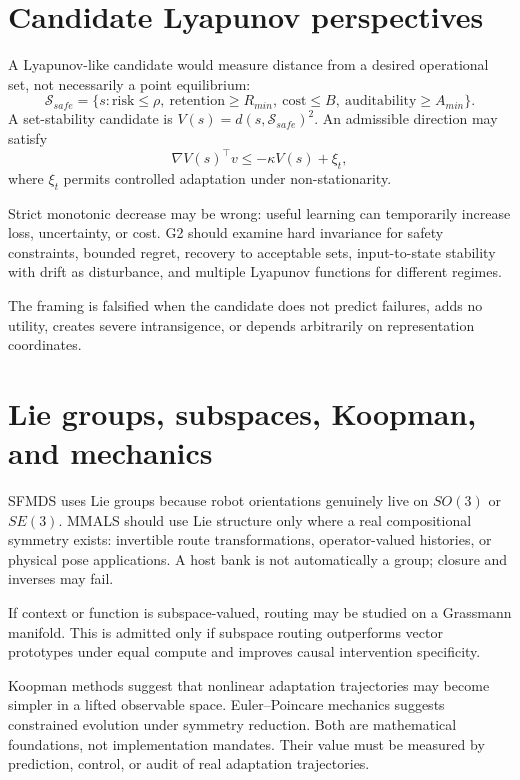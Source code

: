 \documentclass[11pt,a4paper]{article}
\begin{document}
\section{Candidate Lyapunov perspectives}
A Lyapunov-like candidate would measure distance from a desired operational set, not necessarily a point equilibrium:
\begin{equation}
\mathcal{S}_{safe}=\{s:\mathrm{risk}\le\rho,\ \mathrm{retention}\ge R_{min},\ \mathrm{cost}\le B,\ \mathrm{auditability}\ge A_{min}\}.
\end{equation}
A set-stability candidate is $V(s)=d(s,\mathcal{S}_{safe})^2$. An admissible direction may satisfy
\begin{equation}
\nabla V(s)^\top v\le-\kappa V(s)+\xi_t,
\end{equation}
where $\xi_t$ permits controlled adaptation under non-stationarity.

Strict monotonic decrease may be wrong: useful learning can temporarily increase loss, uncertainty, or cost. G2 should examine hard invariance for safety constraints, bounded regret, recovery to acceptable sets, input-to-state stability with drift as disturbance, and multiple Lyapunov functions for different regimes.

The framing is falsified when the candidate does not predict failures, adds no utility, creates severe intransigence, or depends arbitrarily on representation coordinates.

\section{Lie groups, subspaces, Koopman, and mechanics}
SFMDS uses Lie groups because robot orientations genuinely live on $SO(3)$ or $SE(3)$. MMALS should use Lie structure only where a real compositional symmetry exists: invertible route transformations, operator-valued histories, or physical pose applications. A host bank is not automatically a group; closure and inverses may fail.

If context or function is subspace-valued, routing may be studied on a Grassmann manifold. This is admitted only if subspace routing outperforms vector prototypes under equal compute and improves causal intervention specificity.

Koopman methods suggest that nonlinear adaptation trajectories may become simpler in a lifted observable space. Euler--Poincare mechanics suggests constrained evolution under symmetry reduction. Both are mathematical foundations, not implementation mandates. Their value must be measured by prediction, control, or audit of real adaptation trajectories.
\end{document}
